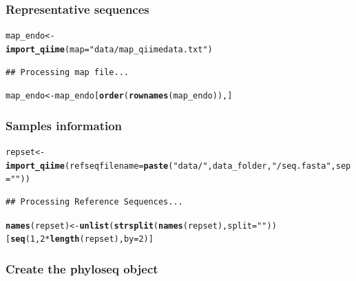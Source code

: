 \documentclass[12pt]{article}\usepackage[]{graphicx}\usepackage[]{color}
\makeatletter
\newcommand{\hlnum}[1]{\textcolor[rgb]{0.686,0.059,0.569}{#1}}%
\newcommand{\hlstr}[1]{\textcolor[rgb]{0.192,0.494,0.8}{#1}}%
\newcommand{\hlopt}[1]{\textcolor[rgb]{0,0,0}{#1}}%
\newcommand{\hlstd}[1]{\textcolor[rgb]{0.345,0.345,0.345}{#1}}%
\newcommand{\hlkwb}[1]{\textcolor[rgb]{0.69,0.353,0.396}{#1}}%
\newcommand{\hlkwc}[1]{\textcolor[rgb]{0.333,0.667,0.333}{#1}}%
\newcommand{\hlkwd}[1]{\textcolor[rgb]{0.737,0.353,0.396}{\textbf{#1}}}%
\newenvironment{kframe}{%
 \def\at@end@of@kframe{}%
 \ifinner\ifhmode%
  \def\at@end@of@kframe{\end{minipage}}%
  \begin{minipage}{\columnwidth}%
 \fi\fi%
 \def\FrameCommand##1{\hskip\@totalleftmargin \hskip-\fboxsep
 \colorbox{shadecolor}{##1}\hskip-\fboxsep
     \hskip-\linewidth \hskip-\@totalleftmargin \hskip\columnwidth}%
 \MakeFramed {\advance\hsize-\width
   \@totalleftmargin\z@ \linewidth\hsize
   \@setminipage}}%
 {\par\unskip\endMakeFramed%
 \at@end@of@kframe}
\newenvironment{knitrout}{}{} %
\numberwithin{figure}{section}
\makeatother
\begin{document}
 \subsubsection{Representative sequences}
\begin{knitrout}\small
{}\color{fgcolor}\begin{kframe}
\begin{alltt}
\hlstd{map_endo} \hlkwb{<-}
  \hlkwd{import_qiime}\hlstd{(}\hlkwc{map} \hlstd{=} \hlstr{"data/map_qiimedata.txt"}\hlstd{)}
\end{alltt}
\begin{verbatim}
## Processing map file...
\end{verbatim}
\begin{alltt}
\hlstd{map_endo} \hlkwb{<-} \hlstd{map_endo[}\hlkwd{order}\hlstd{(}\hlkwd{rownames}\hlstd{(map_endo)),]}
\end{alltt}
\end{kframe}
\end{knitrout}

 \subsubsection{Samples information}
\begin{knitrout}\small
{}\color{fgcolor}\begin{kframe}
\begin{alltt}
\hlstd{repset} \hlkwb{<-} \hlkwd{import_qiime}\hlstd{(}\hlkwc{refseqfilename} \hlstd{=} \hlkwd{paste}\hlstd{(}\hlstr{"data/"}\hlstd{, data_folder,} \hlstr{"/seq.fasta"}\hlstd{,} \hlkwc{sep}\hlstd{=}\hlstr{""}\hlstd{))}
\end{alltt}
\begin{verbatim}
## Processing Reference Sequences...
\end{verbatim}
\begin{alltt}
\hlkwd{names}\hlstd{(repset)} \hlkwb{<-} \hlkwd{unlist}\hlstd{(}\hlkwd{strsplit}\hlstd{(}\hlkwd{names}\hlstd{(repset),} \hlkwc{split} \hlstd{=} \hlstr{" "}\hlstd{))[}\hlkwd{seq}\hlstd{(}\hlnum{1}\hlstd{,} \hlnum{2}\hlopt{*}\hlkwd{length}\hlstd{(repset),} \hlkwc{by}\hlstd{=}\hlnum{2}\hlstd{)]}
\end{alltt}
\end{kframe}
\end{knitrout}

 \subsubsection{Create the phyloseq object}
\end{document}
